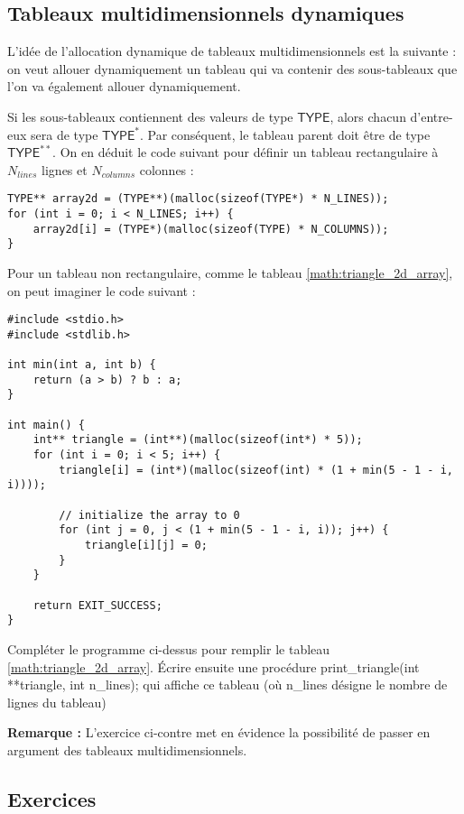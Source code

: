 \documentclass[../../../main.tex]{subfiles}
\begin{document}
\subsection{Tableaux multidimensionnels dynamiques}
L'idée de l'allocation dynamique de tableaux multidimensionnels est la suivante : on veut allouer dynamiquement un tableau qui va contenir des sous-tableaux que l'on va également allouer dynamiquement.
 
\begin{minipage}{\textwidth}
	\begin{center}
		
	\end{center}
\end{minipage}
 
Si les sous-tableaux contiennent des valeurs de type $\textsf{TYPE}$, alors chacun d'entre-eux sera de type $\textsf{TYPE}^{*}$. Par conséquent, le tableau parent doit être de type $\textsf{TYPE}^{**}$. On en déduit le code suivant pour définir un tableau rectangulaire à $N_{lines}$ lignes et $N_{columns}$ colonnes :
\begin{verbatim}
TYPE** array2d = (TYPE**)(malloc(sizeof(TYPE*) * N_LINES));
for (int i = 0; i < N_LINES; i++) {
	array2d[i] = (TYPE*)(malloc(sizeof(TYPE) * N_COLUMNS));
}
\end{verbatim}
Pour un tableau non rectangulaire, comme le tableau \ref{math:triangle_2d_array}, on peut imaginer le code suivant :
\begin{verbatim}
#include <stdio.h>
#include <stdlib.h>

int min(int a, int b) {
	return (a > b) ? b : a;
}

int main() {
	int** triangle = (int**)(malloc(sizeof(int*) * 5));
	for (int i = 0; i < 5; i++) {
		triangle[i] = (int*)(malloc(sizeof(int) * (1 + min(5 - 1 - i, i))));
		
		// initialize the array to 0
		for (int j = 0, j < (1 + min(5 - 1 - i, i)); j++) {
			triangle[i][j] = 0;
		}
	}
	
	return EXIT_SUCCESS;
}
\end{verbatim}
 Compléter le programme ci-dessus pour remplir le tableau \ref{math:triangle_2d_array}. Écrire ensuite une procédure \textsf{print\_triangle(int **triangle, int n\_lines);} qui affiche ce tableau (où \textsf{n\_lines} désigne le nombre de lignes du tableau)
 
\textbf{Remarque :} L'exercice ci-contre met en évidence la possibilité de passer en argument des tableaux multidimensionnels.
\subsection{Exercices}
\end{document}
